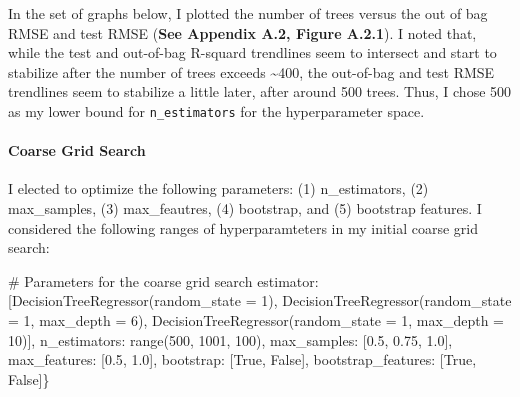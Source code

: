 \documentclass[
  letterpaper,
  DIV=11,
  numbers=noendperiod]{scrartcl}
\let\oldparagraph\paragraph
\renewcommand{\paragraph}[1]{\oldparagraph{#1}\mbox{}}
\newenvironment{Shaded}{\begin{snugshade}}{\end{snugshade}}
\newcommand{\BuiltInTok}[1]{\textcolor[rgb]{0.00,0.23,0.31}{#1}}
\newcommand{\CommentTok}[1]{\textcolor[rgb]{0.37,0.37,0.37}{#1}}
\newcommand{\DecValTok}[1]{\textcolor[rgb]{0.68,0.00,0.00}{#1}}
\newcommand{\FloatTok}[1]{\textcolor[rgb]{0.68,0.00,0.00}{#1}}
\newcommand{\NormalTok}[1]{\textcolor[rgb]{0.00,0.23,0.31}{#1}}
\newcommand{\OperatorTok}[1]{\textcolor[rgb]{0.37,0.37,0.37}{#1}}
\newcommand{\VariableTok}[1]{\textcolor[rgb]{0.07,0.07,0.07}{#1}}
\begin{document}
In the set of graphs below, I plotted the number of trees versus the out
of bag RMSE and test RMSE (\textbf{See Appendix A.2, Figure A.2.1}). I
noted that, while the test and out-of-bag R-squard trendlines seem to
intersect and start to stabilize after the number of trees exceeds
\textasciitilde400, the out-of-bag and test RMSE trendlines seem to
stabilize a little later, after around 500 trees. Thus, I chose 500 as
my lower bound for \texttt{n\_estimators} for the hyperparameter space.

\hypertarget{coarse-grid-search-1}{%
\paragraph{Coarse Grid Search}\label{coarse-grid-search-1}}

I elected to optimize the following parameters: (1) n\_estimators, (2)
max\_samples, (3) max\_feautres, (4) bootstrap, and (5) bootstrap
features. I considered the following ranges of hyperparamteters in my
initial coarse grid search:

\begin{Shaded}
\begin{Highlighting}[]
\CommentTok{\# Parameters for the coarse grid search}
\CommentTok{\textquotesingle{}estimator\textquotesingle{}}\NormalTok{: [DecisionTreeRegressor(random\_state }\OperatorTok{=} \DecValTok{1}\NormalTok{), DecisionTreeRegressor(random\_state }\OperatorTok{=} \DecValTok{1}\NormalTok{, max\_depth }\OperatorTok{=} \DecValTok{6}\NormalTok{), DecisionTreeRegressor(random\_state }\OperatorTok{=} \DecValTok{1}\NormalTok{, max\_depth }\OperatorTok{=} \DecValTok{10}\NormalTok{)],}
\CommentTok{\textquotesingle{}n\_estimators\textquotesingle{}}\NormalTok{: }\BuiltInTok{range}\NormalTok{(}\DecValTok{500}\NormalTok{, }\DecValTok{1001}\NormalTok{, }\DecValTok{100}\NormalTok{),}
\CommentTok{\textquotesingle{}max\_samples\textquotesingle{}}\NormalTok{: [}\FloatTok{0.5}\NormalTok{, }\FloatTok{0.75}\NormalTok{, }\FloatTok{1.0}\NormalTok{],}
\CommentTok{\textquotesingle{}max\_features\textquotesingle{}}\NormalTok{: [}\FloatTok{0.5}\NormalTok{, }\FloatTok{1.0}\NormalTok{],}
\CommentTok{\textquotesingle{}bootstrap\textquotesingle{}}\NormalTok{: [}\VariableTok{True}\NormalTok{, }\VariableTok{False}\NormalTok{],}
\CommentTok{\textquotesingle{}bootstrap\_features\textquotesingle{}}\NormalTok{: [}\VariableTok{True}\NormalTok{, }\VariableTok{False}\NormalTok{]\}}
\end{Highlighting}
\end{Shaded}
\end{document}
